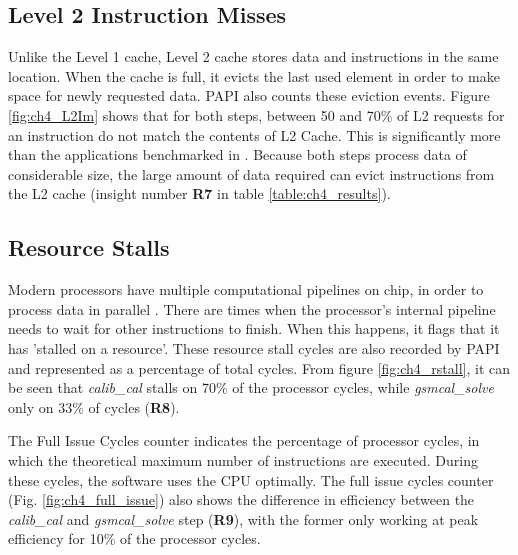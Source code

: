 \subsection{Level 2 Instruction Misses}

Unlike the Level 1 cache, Level 2  cache stores data and instructions in the same location. When the cache is full, it evicts the last used element in order to make space for newly requested data. PAPI also counts these eviction events. 
Figure \ref{fig:ch4_L2Im} shows that for both steps, between 50 and 70\% of L2 requests for an instruction do not match the contents of L2 Cache. This is significantly more than the applications benchmarked in \citep[Table 2]{cache_misses}. Because both steps process data of considerable size, the large amount of data required can evict instructions from the L2 cache (insight number \textbf{R7} in table \ref{table:ch4_results}). 

\subsection{Resource Stalls}

Modern processors have multiple computational pipelines on chip, in order to process data in parallel \citep{pipeline_x86}. There are times when the processor's internal pipeline needs to wait for other instructions to finish. When this happens, it flags that it has 'stalled on a resource'. These resource stall cycles are also recorded by PAPI and represented as a percentage of total cycles. From figure \ref{fig:ch4_rstall}, it can be seen that \textit{calib\_cal} stalls on 70\% of the processor cycles, while  \textit{gsmcal\_solve} only on 33\% of cycles (\textbf{R8}). 

The Full Issue Cycles counter indicates the percentage of processor cycles, in which the theoretical maximum number of instructions are executed. During these cycles, the software uses the CPU optimally. The full issue cycles counter (Fig. \ref{fig:ch4_full_issue}) also shows the difference in efficiency between the \textit{calib\_cal} and \textit{gsmcal\_solve} step  (\textbf{R9}), with the former only working at peak efficiency for 10\% of the processor cycles.

